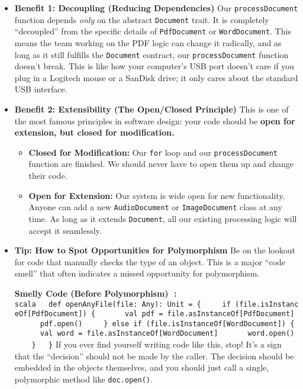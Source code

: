 \documentclass[
  letterpaper,
  DIV=11,
  numbers=noendperiod]{scrreprt}
\providecommand{\tightlist}{%
  \setlength{\itemsep}{0pt}\setlength{\parskip}{0pt}}
\begin{document}
\begin{itemize}
\item
  \textbf{Benefit 1: Decoupling (Reducing Dependencies)} Our
  \texttt{processDocument} function depends \emph{only} on the abstract
  \texttt{Document} trait. It is completely ``decoupled'' from the
  specific details of \texttt{PdfDocument} or \texttt{WordDocument}.
  This means the team working on the PDF logic can change it radically,
  and as long as it still fulfills the \texttt{Document} contract, our
  \texttt{processDocument} function doesn't break. This is like how your
  computer's USB port doesn't care if you plug in a Logitech mouse or a
  SanDisk drive; it only cares about the standard USB interface.
\item
  \textbf{Benefit 2: Extensibility (The Open/Closed Principle)} This is
  one of the most famous principles in software design: your code should
  be \textbf{open for extension, but closed for modification.}

  \begin{itemize}
  \tightlist
  \item
    \textbf{Closed for Modification:} Our \texttt{for} loop and our
    \texttt{processDocument} function are finished. We should never have
    to open them up and change their code.
  \item
    \textbf{Open for Extension:} Our system is wide open for new
    functionality. Anyone can add a new \texttt{AudioDocument} or
    \texttt{ImageDocument} class at any time. As long as it extends
    \texttt{Document}, all our existing processing logic will accept it
    seamlessly.
  \end{itemize}
\item
  \textbf{Tip: How to Spot Opportunities for Polymorphism} Be on the
  lookout for code that manually checks the type of an object. This is a
  major ``code smell'' that often indicates a missed opportunity for
  polymorphism.

  \textbf{Smelly Code (Before Polymorphism) 🤢:}
  \texttt{scala\ \ \ def\ openAnyFile(file:\ Any):\ Unit\ =\ \{\ \ \ \ \ if\ (file.isInstanceOf{[}PdfDocument{]})\ \{\ \ \ \ \ \ \ val\ pdf\ =\ file.asInstanceOf{[}PdfDocument{]}\ \ \ \ \ \ \ pdf.open()\ \ \ \ \ \}\ else\ if\ (file.isInstanceOf{[}WordDocument{]})\ \{\ \ \ \ \ \ \ val\ word\ =\ file.asInstanceOf{[}WordDocument{]}\ \ \ \ \ \ \ word.open()\ \ \ \ \ \}\ \ \ \}}
  If you ever find yourself writing code like this, stop! It's a sign
  that the ``decision'' should not be made by the caller. The decision
  should be embedded in the objects themselves, and you should just call
  a single, polymorphic method like \texttt{doc.open()}.
\end{itemize}
\end{document}
